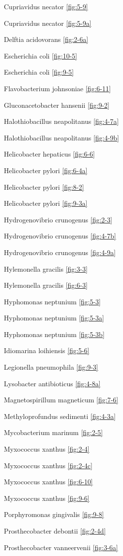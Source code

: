 \documentclass[]{tufte-book}
\begin{document}
Cupriavidus necator \ref{fig:5-9}

Cupriavidus necator \ref{fig:5-9a}

Delftia acidovorans \ref{fig:2-6a}

Escherichia coli \ref{fig:10-5}

Escherichia coli \ref{fig:9-5}

Flavobacterium johnsoniae \ref{fig:6-11}

Gluconacetobacter hansenii \ref{fig:9-2}

Halothiobacillus neapolitanus \ref{fig:4-7a}

Halothiobacillus neapolitanus \ref{fig:4-9b}

Helicobacter hepaticus \ref{fig:6-6}

Helicobacter pylori \ref{fig:6-4a}

Helicobacter pylori \ref{fig:8-2}

Helicobacter pylori \ref{fig:9-3a}

Hydrogenovibrio crunogenus \ref{fig:2-3}

Hydrogenovibrio crunogenus \ref{fig:4-7b}

Hydrogenovibrio crunogenus \ref{fig:4-9a}

Hylemonella gracilis \ref{fig:3-3}

Hylemonella gracilis \ref{fig:6-3}

Hyphomonas neptunium \ref{fig:5-3}

Hyphomonas neptunium \ref{fig:5-3a}

Hyphomonas neptunium \ref{fig:5-3b}

Idiomarina loihiensis \ref{fig:5-6}

Legionella pneumophila \ref{fig:9-3}

Lysobacter antibioticus \ref{fig:4-8a}

Magnetospirillum magneticum \ref{fig:7-6}

Methyloprofundus sedimenti \ref{fig:4-3a}

Mycobacterium marinum \ref{fig:2-5}

Myxococcus xanthus \ref{fig:2-4}

Myxococcus xanthus \ref{fig:2-4c}

Myxococcus xanthus \ref{fig:6-10}

Myxococcus xanthus \ref{fig:9-6}

Porphyromonas gingivalis \ref{fig:9-8}

Prosthecobacter debontii \ref{fig:2-4d}

Prosthecobacter vanneervenii \ref{fig:3-6a}
\end{document}
